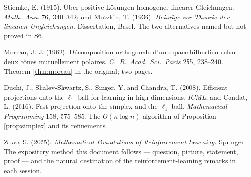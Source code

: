 \documentclass[11pt,a4paper]{article}
\theoremstyle{definition}
\theoremstyle{plain}
\theoremstyle{remark}
\begin{document}
\begin{enumerate}[label={[\arabic*]}]
\item Stiemke, E. (1915). \"Uber positive L\"osungen homogener linearer Gleichungen.
\emph{Math.\ Ann.} 76, 340--342; and Motzkin, T. (1936). \emph{Beitr\"age zur Theorie der
linearen Ungleichungen}. Dissertation, Basel. The two alternatives named but not proved in S6.
\item Moreau, J.-J. (1962). D\'ecomposition orthogonale d'un espace hilbertien selon deux
c\^ones mutuellement polaires. \emph{C.\ R.\ Acad.\ Sci.\ Paris} 255, 238--240. Theorem
\ref{thm:moreau} in the original; two pages.
\item Duchi, J., Shalev-Shwartz, S., Singer, Y. and Chandra, T. (2008). Efficient projections
onto the $\ell_1$-ball for learning in high dimensions. \emph{ICML}; and Condat, L. (2016). Fast
projection onto the simplex and the $\ell_1$ ball. \emph{Mathematical Programming} 158,
575--585. The $O(n\log n)$ algorithm of Proposition \ref{prop:simplex} and its refinements.
\item Zhao, S. (2025). \emph{Mathematical Foundations of Reinforcement Learning}. Springer. The
expository method this document follows --- question, picture, statement, proof --- and the
natural destination of the reinforcement-learning remarks in each session.
\end{enumerate}
\end{document}
